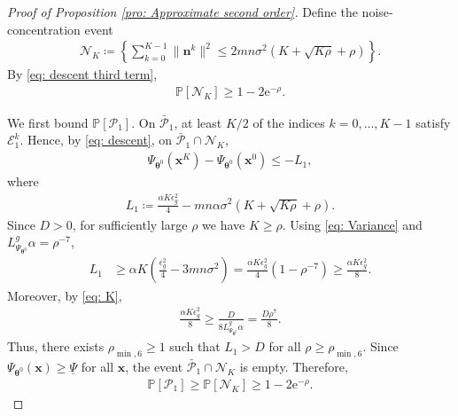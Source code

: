 \documentclass{siamart251216}
\begin{document}
\begin{proof}[Proof of Proposition \ref{pro: Approximate second order}]
    Define the noise-concentration event
    \begin{gather*}
        \mathcal{N}_{K}\coloneqq
        \left\{\sum_{k=0}^{K-1}\|\mathbf{n}^{k}\|^{2}
        \leq2mn\sigma^{2}(K+\sqrt{K\rho}+\rho)\right\}.
    \end{gather*}
    By \eqref{eq: descent third term},
    \begin{gather}
        \label{eq: global noise event}
        \mathbb{P}[\mathcal{N}_{K}]\geq1-2\mathrm{e}^{-\rho}.
    \end{gather}

    We first bound $\mathbb{P}[\mathcal{P}_{1}]$. On $\bar{\mathcal{P}}_{1}$, at least $K/2$ of the indices $k=0,\ldots,K-1$ satisfy $\mathcal{E}_{1}^{k}$. Hence, by \eqref{eq: descent}, on $\bar{\mathcal{P}}_{1}\cap\mathcal{N}_{K}$,
    \begin{gather*}
        \Psi_{\boldsymbol{\theta}^{0}}(\mathbf{x}^{K})
        -\Psi_{\boldsymbol{\theta}^{0}}(\mathbf{x}^{0})
        \leq-L_{1},
    \end{gather*}
    where
    \begin{gather*}
        L_{1}\coloneqq
        \frac{\alpha K\epsilon_g^{2}}{4}
        -mn\alpha\sigma^{2}(K+\sqrt{K\rho}+\rho).
    \end{gather*}
    Since $D>0$, for sufficiently large $\rho$ we have $K\geq\rho$. Using \eqref{eq: Variance} and $L_{\Psi_{\boldsymbol{\theta}^{0}}}^{g}\alpha=\rho^{-7}$,
    \begin{align*}
        L_{1}
        &\geq
        \alpha K\left(\frac{\epsilon_g^{2}}{4}-3mn\sigma^{2}\right)
        =
        \frac{\alpha K\epsilon_g^{2}}{4}(1-\rho^{-7})
        \geq\frac{\alpha K\epsilon_g^{2}}{8}.
    \end{align*}
    Moreover, by \eqref{eq: K},
    \begin{gather*}
        \frac{\alpha K\epsilon_g^{2}}{8}
        \geq\frac{D}{8L_{\Psi_{\boldsymbol{\theta}^{0}}}^{g}\alpha}
        =\frac{D\rho^{7}}{8}.
    \end{gather*}
    Thus, there exists $\rho_{\min,6}\geq1$ such that $L_{1}>D$ for all $\rho\geq\rho_{\min,6}$. Since $\Psi_{\boldsymbol{\theta}^{0}}(\mathbf{x})\geq\underline{\Psi}$ for all $\mathbf{x}$, the event $\bar{\mathcal{P}}_{1}\cap\mathcal{N}_{K}$ is empty. Therefore,
    \begin{gather}
        \label{eq: Contradiction 1}
        \mathbb{P}[\mathcal{P}_{1}]
        \geq\mathbb{P}[\mathcal{N}_{K}]
        \geq1-2\mathrm{e}^{-\rho}.
    \end{gather}


\end{proof}
\end{document}
